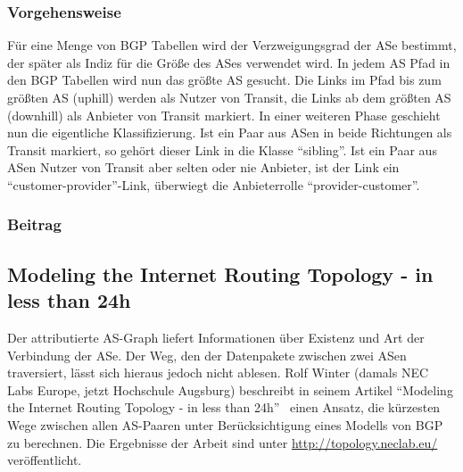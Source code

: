\subsubsection{Vorgehensweise}
Für eine Menge von BGP Tabellen wird der Verzweigungsgrad der ASe bestimmt, der später als Indiz für die Größe des ASes verwendet wird.
In jedem AS Pfad in den BGP Tabellen wird nun das größte AS gesucht.
Die Links im Pfad bis zum größten AS (uphill) werden als Nutzer von Transit, die Links ab dem größten AS (downhill) als Anbieter von Transit markiert.
In einer weiteren Phase geschieht nun die eigentliche Klassifizierung.
Ist ein Paar aus ASen in beide Richtungen als Transit markiert, so gehört dieser Link in die Klasse "`sibling"'.
Ist ein Paar aus ASen Nutzer von Transit aber selten oder nie Anbieter, ist der Link ein "`customer-provider"'-Link, überwiegt die Anbieterrolle "`provider-customer"'.

\subsubsection{Beitrag}

\subsection{Modeling the Internet Routing Topology - in less than 24h}\label{subsec:winter}
Der attributierte AS-Graph liefert Informationen über Existenz und Art der Verbindung der ASe.
Der Weg, den der Datenpakete zwischen zwei ASen traversiert, lässt sich hieraus jedoch nicht ablesen.
Rolf Winter (damals NEC Labs Europe, jetzt Hochschule Augsburg) beschreibt in seinem Artikel "`Modeling the Internet Routing Topology - in less than 24h"'~\cite{conf/pads/Winter09} einen Ansatz, die kürzesten Wege zwischen allen AS-Paaren unter Berücksichtigung eines Modells von BGP zu berechnen.
Die Ergebnisse der Arbeit sind unter \url{http://topology.neclab.eu/} veröffentlicht.

